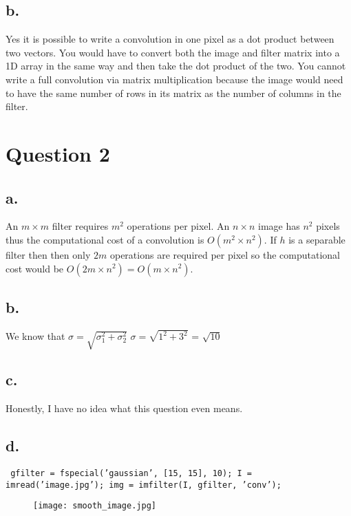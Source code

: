 \documentclass{article}
\begin{document}
\subsection*{b.}

Yes it is possible to write a convolution in one pixel as a dot product between two vectors. You would have to convert both the image and filter matrix into a 1D array in the same way and then take the dot product of the two. You cannot write a full convolution via matrix multiplication because the image would need to have the same number of rows in its matrix as the number of columns in the filter.

\section*{Question 2}

\subsection*{a.}
An $m \times m$ filter requires $m^{2}$ operations per pixel. An $n \times n$ image has $n^{2}$ pixels thus the computational cost of a convolution is $O(m^{2} \times n^{2})$. If $h$ is a separable filter then then only $2m$ operations are required per pixel so the computational cost would be $O(2m \times n^{2}) = O(m \times n^{2})$.

\subsection*{b.}
We know that $\sigma  = \sqrt{\sigma^{2}_{1} + \sigma^{2}_{2}}$
\newline\newline
$\sigma = \sqrt{1^{2} + 3^{2}}$ = $\sqrt{10}$

\subsection*{c.}
Honestly, I have no idea what this question even means.

\subsection*{d.}
\texttt{\noindent
gfilter = fspecial('gaussian', [15, 15],  10);
\newline
I = imread('image.jpg');
\newline
img = imfilter(I, gfilter, 'conv');
}

\begin{figure}[h!]
\centering
\texttt{[image: smooth\_image.jpg]}
\label{fig:sample graph}
\end{figure}
\end{document}
